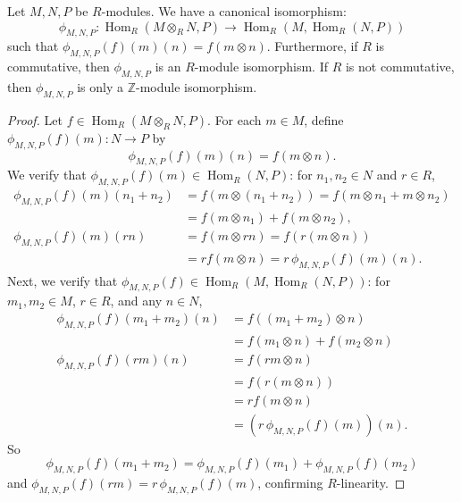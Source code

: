 \begin{theorem}
    Let $M, N, P$ be $R$-modules. We have a canonical isomorphism:
    \[
        \phi_{M,N,P}: \operatorname{Hom}_R(M \otimes_R N, P) \to \operatorname{Hom}_R(M, \operatorname{Hom}_R(N, P))
    \]
    such that $\phi_{M,N,P}(f)(m)(n) = f(m \otimes n)$.
    Furthermore, if $R$ is commutative, then $\phi_{M,N,P}$ is an $R$-module isomorphism. If $R$ is not commutative, then $\phi_{M,N,P}$ is only a $\mathbb{Z}$-module isomorphism.
\end{theorem}

\begin{proof}
    Let $f \in \operatorname{Hom}_R(M \otimes_R N, P)$. For each $m \in M$, define $\phi_{M,N,P}(f)(m): N \to P$ by
    \[
        \phi_{M,N,P}(f)(m)(n) = f(m \otimes n).
    \]
    We verify that $\phi_{M,N,P}(f)(m) \in \operatorname{Hom}_R(N, P)$: for $n_1, n_2 \in N$ and $r \in R$,
    \begin{align*}
        \phi_{M,N,P}(f)(m)(n_1 + n_2) & = f(m \otimes (n_1+n_2)) = f(m \otimes n_1 + m \otimes n_2) \\
                                      & = f(m\otimes n_1) + f(m\otimes n_2),                        \\
        \phi_{M,N,P}(f)(m)(rn)        & = f(m \otimes rn) = f(r(m\otimes n))                        \\
                                      & = rf(m\otimes n) = r\,\phi_{M,N,P}(f)(m)(n).
    \end{align*}
    Next, we verify that $\phi_{M,N,P}(f) \in \operatorname{Hom}_R(M, \operatorname{Hom}_R(N,P))$: for $m_1, m_2 \in M$, $r \in R$, and any $n\in N$,
    \begin{align*}
        \phi_{M,N,P}(f)(m_1+m_2)(n) & = f((m_1+m_2)\otimes n)             \\
                                    & = f(m_1\otimes n) + f(m_2\otimes n) \\
        \phi_{M,N,P}(f)(rm)(n)      & = f(rm\otimes n)                    \\
                                    & = f(r(m\otimes n))                  \\
                                    & = rf(m\otimes n)                    \\
                                    & = (r\,\phi_{M,N,P}(f)(m))(n).
    \end{align*}
    So
    \[
        \phi_{M,N,P}(f)(m_1+m_2) = \phi_{M,N,P}(f)(m_1)+\phi_{M,N,P}(f)(m_2)
    \]
    and $\phi_{M,N,P}(f)(rm) = r\,\phi_{M,N,P}(f)(m)$, confirming $R$-linearity.


\end{proof}
